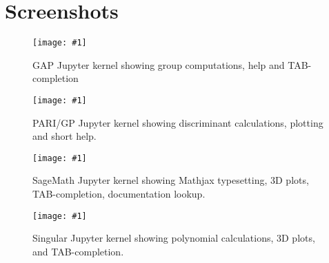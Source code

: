 \documentclass{deliverablereport}
\author{Jeroen Demeyer, Markus Pfeiffer, Nicolas M. Thiéry}
\begin{document}
\maketitle
\githubissuedescription
\tableofcontents
\clearpage
\appendix
\section{Screenshots}
\newcommand{\screenshot}[2]{
\begin{figure}[ht]
  \texttt{[image: \#1]}
  \caption{#2}
\end{figure}}

\screenshot{gap.png}{GAP Jupyter kernel showing group computations,
  help and TAB-completion}
\screenshot{pari.png}{PARI/GP Jupyter kernel showing
    discriminant calculations, plotting and short help.}
\screenshot{sage.png}{SageMath Jupyter kernel showing Mathjax
    typesetting, 3D plots, TAB-completion, documentation lookup.}
\screenshot{singular.png}{Singular Jupyter kernel showing polynomial
    calculations, 3D plots, and TAB-completion.}

\clearpage
\end{document}
